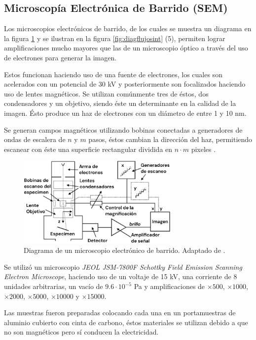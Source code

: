 \documentclass[../main.tex]{subfiles}
\begin{document}
\subsection{Microscopía Electrónica de Barrido (SEM)}
Los microscopios electrónicos de barrido, de los cuales se muestra un diagrama en la figura \ref{fig:semdiag} y se ilustran en la figura \ref{fig:diagflujosint} (5), permiten lograr amplificaciones mucho mayores que las de un microscopio óptico a través del uso de electrones para generar la imagen.

Estos funcionan haciendo uso de una fuente de electrones, los cuales son acelerados con un potencial de 30 kV y posteriormente son focalizados haciendo uso de lentes magnéticos. Se utilizan comúnmente tres de éstos, dos condensadores y un objetivo, siendo éste un determinante en la calidad de la imagen. Ésto produce un haz de electrones con un diámetro de entre 1 y 10 nm.

Se generan campos magnéticos utilizando bobinas conectadas a generadores de ondas de escalera de $n$ y $m$ pasos, éstos cambian la dirección del haz, permitiendo escanear con éste una superficie rectangular dividida en $n\cdot m$ pixeles \cite{Egerton2005}.
\begin{figure}[H]
    \centering
    \includegraphics[width=0.7\textwidth]{fig/semdiag.png}
    \caption{Diagrama de un microscopio electrónico	de barrido. Adaptado de \cite{Egerton2005}.}
    \label{fig:semdiag}
\end{figure}
Se utilizó un microscopio \textit{JEOL JSM-7800F Schottky Field Emission Scanning Electron Microscope}, haciendo uso de un voltaje de 15 kV, una corriente de 8 unidades arbitrarias, un vacío de $9.6\cdot10^{-5}$ Pa y amplificaciones de $\times500$, $\times1000$, $\times2000$, $\times5000$, $\times10000$ y $\times15000$.

Las muestras fueron preparadas colocando cada una en un portamuestras de aluminio cubierto con cinta de carbono, éstos materiales se utilizan debido a que no son magnéticos pero sí conducen la electricidad.
\end{document}
